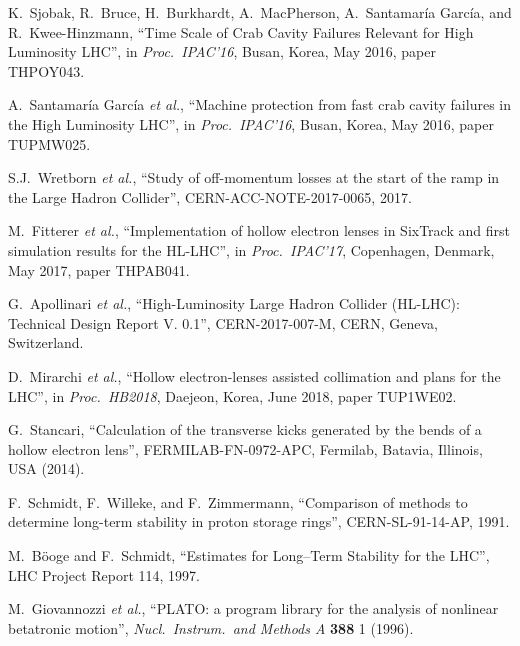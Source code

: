 \documentclass{ws-ijmpa}
\begin{document}
\begin{thebibliography}{99}
K.~Sjobak, R.~Bruce, H.~Burkhardt, A.~MacPherson, A.~Santamaría García, and R.~Kwee-Hinzmann, ``Time Scale of Crab Cavity Failures Relevant for High Luminosity LHC'', in {\it Proc.~IPAC’16}, Busan, Korea, May 2016, paper THPOY043.

A.~Santamaría García {\it et al.},
``Machine protection from fast crab cavity failures in the High Luminosity LHC'', in {\it Proc.~IPAC’16}, Busan, Korea, May 2016, paper TUPMW025.
 
S.J.\ Wretborn {\it et al.}, ``Study of off-momentum losses at the start of the ramp in the Large Hadron Collider'', CERN-ACC-NOTE-2017-0065, 2017.

M.~Fitterer {\it et al.},
``Implementation of hollow electron lenses in SixTrack and first simulation results for the HL-LHC'', in {\it Proc.~IPAC’17}, Copenhagen, Denmark, May 2017, paper THPAB041.

G.~Apollinari  {\it et al.}, ``High-Luminosity Large Hadron Collider (HL-LHC):
Technical Design Report V. 0.1'', CERN-2017-007-M, CERN, Geneva, Switzerland.

D.~Mirarchi {\it et al.},
``Hollow electron-lenses assisted collimation and plans for the LHC'', in {\it Proc.~HB2018}, Daejeon, Korea, June 2018, paper TUP1WE02.

G.~Stancari, ``Calculation of the transverse kicks generated by the bends of a hollow
electron lens'', FERMILAB-FN-0972-APC, Fermilab, Batavia, Illinois, USA (2014).


F.~Schmidt, F.~Willeke, and F.~Zimmermann, ``Comparison of methods to determine long-term stability in proton storage rings'', CERN-SL-91-14-AP, 1991. 

M.~B\"ooge and F.~Schmidt, ``{Estimates for Long–Term Stability for the LHC}'', LHC Project Report 114, 1997.

M.~Giovannozzi {\it et al.}, ``PLATO: a program library for the analysis of nonlinear betatronic motion'', {\it Nucl.\ Instrum.\ and Methods A} {\bf 388} 1 (1996).


\end{thebibliography}
\end{document}

